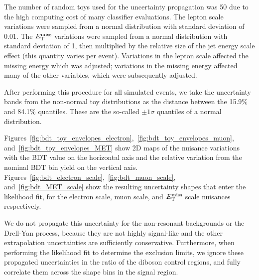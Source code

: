 The number of random toys used for the uncertainty propagation was 50 due to the high computing cost of many classifier evaluations. 
The lepton scale variations were sampled from a normal distribution with standard deviation of 0.01.
The $E_\mathrm{T}^{\mathrm{miss}}$ variations were sampled from a normal distribution with standard deviation of 1, then multiplied by the relative size of the jet energy scale effect (this quantity varies per event).
Variations in the lepton scale affected the missing energy which was adjusted; variations in the missing energy affected many of the other variables, which were subsequently adjusted. 

After performing this procedure for all simulated events, we take the uncertainty bands from the non-normal toy distributions as the distance between the 15.9\% and 84.1\% quantiles.
These are the so-called $\pm1\sigma$ quantiles of a normal distribution.

Figures~\ref{fig:bdt_toy_envelopes_electron},~\ref{fig:bdt_toy_envelopes_muon}, and~\ref{fig:bdt_toy_envelopes_MET} show 2D maps of the nuisance variations with the BDT value on the horizontal axis and the relative variation from the nominal BDT bin yield on the vertical axis.
Figures~\ref{fig:bdt_electron_scale},~\ref{fig:bdt_muon_scale}, and~\ref{fig:bdt_MET_scale} show the resulting uncertainty shapes that enter the likelihood fit, for the electron scale, muon scale, and $E_\mathrm{T}^{\mathrm{miss}}$ scale nuisances respectively. 

We do not propagate this uncertainty for the non-resonant backgrounds or the Drell-Yan process, 
because they are not highly signal-like and the other extrapolation uncertainties are sufficiently conservative.
Furthermore, when performing the likelihood fit to determine the exclusion limits, 
we ignore these propagated uncertainties in the ratio of the diboson control regions, 
and fully correlate them across the shape bins in the signal region. 

